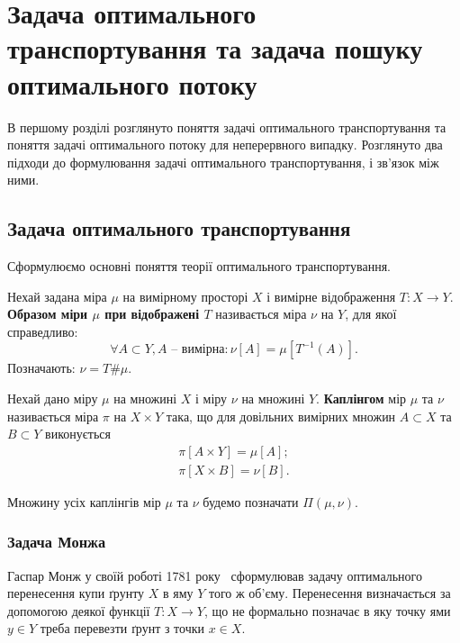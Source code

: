 \chapter{Задача оптимального транспортування та задача пошуку оптимального потоку}
\label{chap:review}
В першому розділі розглянуто поняття задачі оптимального транспортування та 
поняття задачі оптимального потоку для неперервного випадку.
Розглянуто два підходи до формулювання задачі оптимального транспортування, і зв'язок між ними.

\section{Задача оптимального транспортування}
\label{sec:optimal-transport}
Сформулюємо основні поняття теорії оптимального транспортування.

\begin{definition}
    \label{def:push-forward}
    Нехай задана міра $\mu$ на вимірному просторі $X$ і вимірне відображення $T : X \to Y$.
    \textbf{Образом міри $\mu$ при відображені $T$} називається міра $\nu$ на $Y$, для якої справедливо:
    $$
        \forall A \subset Y, A\text{ -- вимірна}: \nu[A] = \mu\left[T^{-1}(A)\right].
    $$
    Позначають: $\nu = T \# \mu$.
\end{definition}


\begin{definition}
    \label{def:coupling}
    Нехай дано міру $\mu$ на множині $X$ і міру $\nu$ на множині $Y$. \textbf{Каплінгом} мір $\mu$ та $\nu$ називається
    міра $\pi$ на $X \times Y$ така, що для довільних вимірних множин $A \subset X$ та $B \subset Y$ виконується
    \begin{eqnarray}
        \pi[A \times Y] = \mu[A]; \\
        \pi[X \times B] = \nu[B].
    \end{eqnarray}
\end{definition}

Множину усіх каплінгів мір $\mu$ та $\nu$ будемо позначати $\Pi(\mu, \nu)$.

\subsection{Задача Монжа}
\label{sec:monge-problem}
Гаспар Монж у своїй роботі 1781 року~\cite{monge1781} сформулював задачу оптимального перенесення купи ґрунту $X$ 
в яму $Y$ того ж об'єму. Перенесення визначається за допомогою деякої функції $T : X \to Y$, що не формально
позначає в яку точку ями $y \in Y$ треба перевезти ґрунт з точки $x \in X$.

